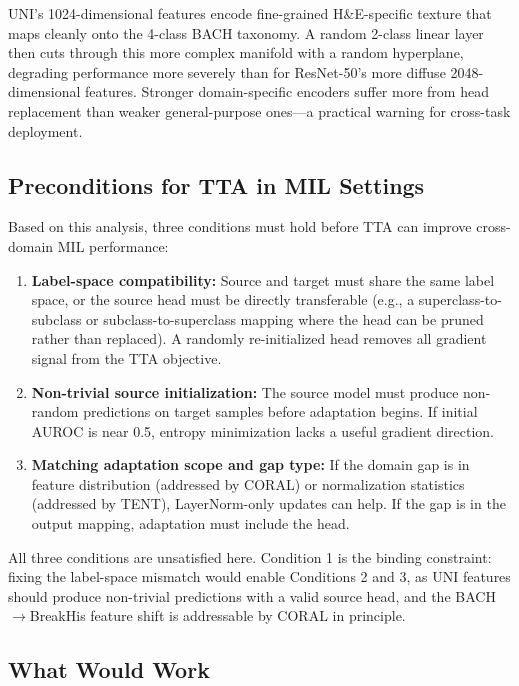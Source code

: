 \documentclass[conference]{IEEEtran}
\begin{document}
UNI's 1024-dimensional features encode fine-grained H\&E-specific texture that maps cleanly onto the 4-class BACH taxonomy. A random 2-class linear layer then cuts through this more complex manifold with a random hyperplane, degrading performance more severely than for ResNet-50's more diffuse 2048-dimensional features. Stronger domain-specific encoders suffer more from head replacement than weaker general-purpose ones---a practical warning for cross-task deployment.

\subsection{Preconditions for TTA in MIL Settings}

Based on this analysis, three conditions must hold before TTA can improve cross-domain MIL performance:

\begin{enumerate}
    \item \textbf{Label-space compatibility:} Source and target must share the same label space, or the source head must be directly transferable (e.g., a superclass-to-subclass or subclass-to-superclass mapping where the head can be pruned rather than replaced). A randomly re-initialized head removes all gradient signal from the TTA objective.

    \item \textbf{Non-trivial source initialization:} The source model must produce non-random predictions on target samples before adaptation begins. If initial AUROC is near 0.5, entropy minimization lacks a useful gradient direction.

    \item \textbf{Matching adaptation scope and gap type:} If the domain gap is in feature distribution (addressed by CORAL) or normalization statistics (addressed by TENT), LayerNorm-only updates can help. If the gap is in the output mapping, adaptation must include the head.
\end{enumerate}

All three conditions are unsatisfied here. Condition 1 is the binding constraint: fixing the label-space mismatch would enable Conditions 2 and 3, as UNI features should produce non-trivial predictions with a valid source head, and the BACH$\rightarrow$BreakHis feature shift is addressable by CORAL in principle.

\subsection{What Would Work}
\end{document}
